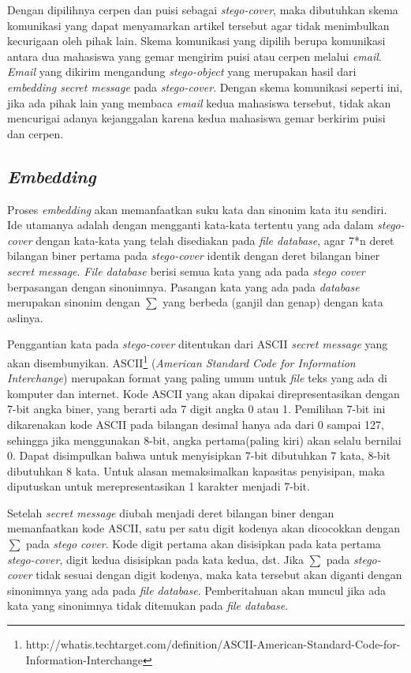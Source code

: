 Dengan dipilihnya cerpen dan puisi sebagai \textit{stego-cover}, maka dibutuhkan skema komunikasi yang dapat menyamarkan artikel tersebut agar tidak menimbulkan kecurigaan oleh pihak lain. Skema komunikasi yang dipilih berupa komunikasi antara dua mahasiswa yang gemar mengirim puisi atau cerpen melalui \textit{email}. \textit{Email} yang dikirim mengandung \textit{stego-object} yang merupakan hasil dari \textit{embedding secret message} pada \textit{stego-cover}. Dengan skema komunikasi seperti ini, jika ada pihak lain yang membaca \textit{email} kedua mahasiswa tersebut, tidak akan mencurigai adanya kejanggalan karena kedua mahasiswa gemar berkirim puisi dan cerpen.

\subsection{\textit{Embedding}}
Proses \textit{embedding} akan memanfaatkan suku kata dan sinonim kata itu sendiri. Ide utamanya adalah dengan mengganti kata-kata tertentu yang ada dalam \textit{stego-cover} dengan kata-kata yang telah disediakan pada \textit{file database}, agar 7*n deret bilangan biner pertama pada \textit{stego-cover} identik dengan deret bilangan biner \textit{secret message}.  \textit{File database} berisi semua kata yang ada pada \textit{stego cover} berpasangan dengan sinonimnya. Pasangan kata yang ada pada \textit{database} merupakan sinonim dengan $\sum$ yang berbeda (ganjil dan genap) dengan kata aslinya.

Penggantian kata pada \textit{stego-cover} ditentukan dari ASCII \textit{secret message} yang akan disembunyikan. ASCII\footnote{http://whatis.techtarget.com/definition/ASCII-American-Standard-Code-for-Information-Interchange} (\textit{American Standard Code for Information Interchange}) merupakan format yang paling umum untuk \textit{file} teks yang ada di komputer dan internet. Kode ASCII yang akan dipakai direpresentasikan dengan 7-bit angka biner, yang berarti ada 7 digit angka 0 atau 1. Pemilihan 7-bit ini dikarenakan kode ASCII pada bilangan desimal hanya ada dari 0 sampai 127, sehingga jika menggunakan 8-bit, angka pertama(paling kiri) akan selalu bernilai 0. Dapat disimpulkan bahwa untuk menyisipkan 7-bit dibutuhkan 7 kata, 8-bit dibutuhkan 8 kata.  Untuk alasan memaksimalkan kapasitas penyisipan, maka diputuskan untuk merepresentasikan 1 karakter menjadi 7-bit.

Setelah \textit{secret message} diubah menjadi deret bilangan biner dengan memanfaatkan kode ASCII, satu per satu digit kodenya akan dicocokkan dengan $\sum$ pada \textit{stego cover}. Kode digit pertama akan disisipkan pada kata pertama \textit{stego-cover}, digit kedua disisipkan pada kata kedua, dst. Jika $\sum$ pada \textit{stego-cover} tidak sesuai dengan digit kodenya, maka kata tersebut akan diganti dengan sinonimnya yang ada pada \textit{file database}. Pemberitahuan akan muncul jika ada kata yang sinonimnya tidak ditemukan pada \textit{file database}.

